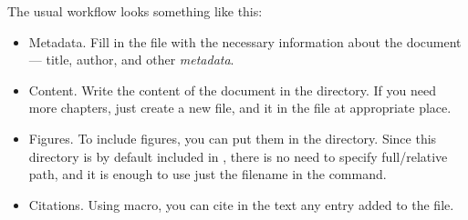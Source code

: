 The usual workflow looks something like this:
\begin{itemize}
    \item \textsf{Metadata.} Fill in the  file with the necessary information about the document --- title, author, and other \emph{metadata}.
    \item \textsf{Content.} Write the content of the document in the  directory.
          If you need more chapters, just create a new file, and \macro{} it in the  file at appropriate place.
    \item \textsf{Figures.} To include figures, you can put them in the  directory.
          Since this directory is by default included in \macro{\graphicspath}, there is no need to specify full/relative path, and it is enough to use just the filename in the  command.
    \item \textsf{Citations.} Using  \macro{\autocite} macro, you can cite in the text any entry added to the  file.
\end{itemize}

